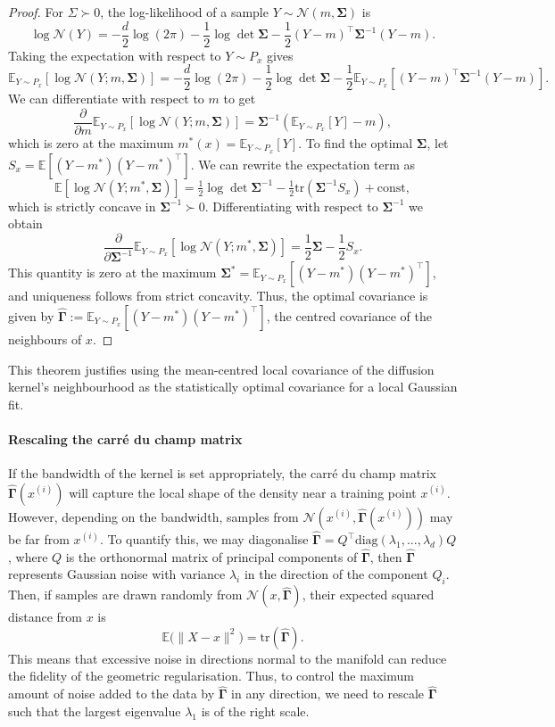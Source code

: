 \documentclass{article} %
\newcommand{\E}{\mathbb{E}}
\newcommand{\N}{\mathcal{N}}
\newcommand{\G}{\widehat{\mathbf{\Gamma}}}
\newcommand{\Si}{\mathbf{\Sigma}}
\begin{document}
\begin{proof}
For $\Sigma\succ0$, the log-likelihood of a sample $Y\sim \mathcal{N}(m, \Si)$ is
\[
\log \N(Y) = -\frac{d}{2}\log(2\pi) - \frac{1}{2}\log\det \Si - \frac{1}{2}(Y - m)^\top \Si^{-1} (Y - m).
\]
Taking the expectation with respect to $Y \sim P_x$ gives
\[
\E_{Y \sim P_x}\left[\log \N(Y; m, \Si)\right] = -\frac{d}{2}\log(2\pi) - \frac{1}{2}\log \det\Si - \frac{1}{2}\E_{Y \sim P_x}\left[(Y - m)^\top \Si^{-1} (Y - m)\right].
\]
We can differentiate with respect to $m$ to get
\[
\frac{\partial}{\partial m} \E_{Y \sim P_x}\left[\log \N(Y; m, \Si)\right] = \Si^{-1} (\E_{Y \sim P_x}[Y] - m),
\]
which is zero at the maximum $m^*(x) = \E_{Y \sim P_x}[Y]$.
To find the optimal $\Si$, let $S_x=\E[(Y-m^*)(Y-m^*)^\top]$. We can rewrite the expectation term as 
\[
\E[\log \mathcal{N}(Y;m^*,\Si)]
= \tfrac{1}{2}\log\det\Si^{-1} - \tfrac{1}{2}\mathrm{tr}(\Si^{-1} S_x) + \text{const},
\]
which is strictly concave in $\Si^{-1}\succ0$.
Differentiating with respect to $\Si^{-1}$ we obtain
\[
\frac{\partial}{\partial \Si^{-1}} \E_{Y \sim P_x}\left[\log \N(Y; m^*, \Si)\right] = \frac{1}{2}\Si - \frac{1}{2}S_x.
\]
This quantity is zero at the maximum $\Si^* = \E_{Y \sim P_x}\left[(Y - m^*)(Y - m^*)^\top\right]$, and uniqueness follows from strict concavity. 
Thus, the optimal covariance is given by $\G := \E_{Y \sim P_x}\left[(Y - m^*)(Y - m^*)^\top\right]$, the centred covariance of the neighbours of $x$.
\end{proof}

This theorem justifies using the mean-centred local covariance of the diffusion kernel's neighbourhood as the statistically optimal covariance for a local Gaussian fit.

\paragraph{Rescaling the carré du champ matrix} \label{section:rescaling}

If the bandwidth of the kernel is set appropriately, the carré du champ matrix $\G(x^{(i)})$ will capture the local shape of the density near a training point $x^{(i)}$.
However, depending on the bandwidth, samples from $\N(x^{(i)}, \G(x^{(i)}))$ may be far from $x^{(i)}$.
To quantify this, we may diagonalise $\G = Q^\top \text{diag}(\lambda_1,...,\lambda_d) Q$, where $Q$ is the orthonormal matrix of principal components of $\G$, then $\G$ represents Gaussian noise with variance $\lambda_i$ in the direction of the component $Q_i$.
Then, if samples are drawn randomly from $\N(x, \G)$, their expected squared distance from $x$ is
\[
\E\big(\| X - x \|^2 \big) = \mathrm{tr}(\G).
\]
This means that excessive noise in directions normal to the manifold can reduce the fidelity of the geometric regularisation.
Thus, to control the maximum amount of noise added to the data by $\G$ in any direction, we need to rescale $\G$ such that the largest eigenvalue $\lambda_1$ is of the right scale.
\end{document}
